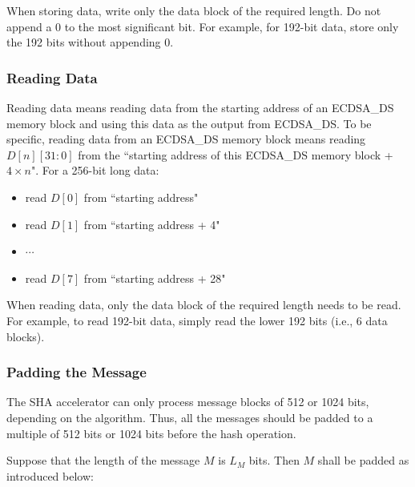 \documentclass[main\_\_EN.tex]{subfiles}
\begin{document}
\begin{tiplisting}
When storing data, write only the data block of the required length. Do not append a 0 to the most significant bit. For example, for 192-bit data, store only the 192 bits without appending 0.
\end{tiplisting}

\subsubsection{Reading Data}

Reading data means reading data from the starting address of an ECDSA\_DS memory block and using this data as the output from ECDSA\_DS. To be specific, reading data from an ECDSA\_DS memory block means reading $D[n][31:0]$ from the ``starting address of this ECDSA\_DS memory block + $4 \times n$".
For a 256-bit long data:
\begin{itemize}
    \item read $D[0]$ from ``starting address"
    \item read $D[1]$ from ``starting address + 4"
    \item $\cdots$
    \item read $D[7]$ from ``starting address + 28"
\end{itemize}

\begin{tiplisting}
When reading data, only the data block of the required length needs to be read. For example, to read 192-bit data, simply read the lower 192 bits (i.e., 6 data blocks).
\end{tiplisting}

\subsubsection{Padding the Message}\label{sec:ecdsa-msg-padding}

The SHA accelerator can only process message blocks of 512 or 1024 bits, depending on the algorithm. Thus, all the messages should be padded to a multiple of 512 bits or 1024 bits before the hash operation.

Suppose that the length of the message \begin{math}M\end{math} is \begin{math} L_M \end{math} bits. Then \begin{math} M \end{math} shall be padded as introduced below:
\end{document}
